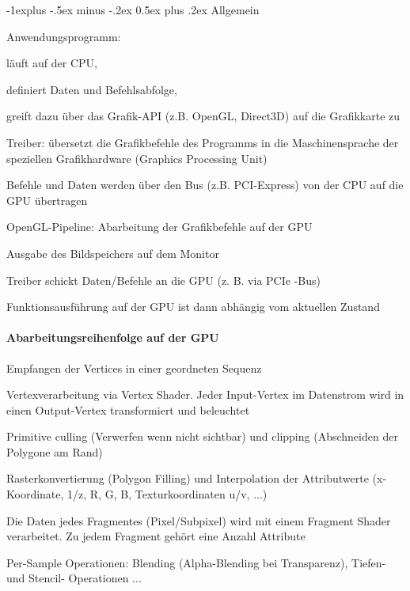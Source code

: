 \documentclass[landscape]{article}
\makeatletter
\renewcommand{\subsection}{\@startsection{subsection}{2}{0mm}%
                                {-1explus -.5ex minus -.2ex}%
                                {0.5ex plus .2ex}%
                                {\normalfont\normalsize\bfseries}}
\makeatother
\begin{document}
\begin{multicols}{3}
  \subsection{Allgemein}
  \begin{itemize*}
    \item Anwendungsprogramm:
    \begin{itemize*}
      \item läuft auf der CPU,
      \item definiert Daten und Befehlsabfolge,
      \item greift dazu über das Grafik-API (z.B. OpenGL, Direct3D) auf die Grafikkarte zu
    \end{itemize*}
    \item Treiber: übersetzt die Grafikbefehle des Programms in die Maschinensprache der speziellen Grafikhardware (Graphics Processing Unit)
    \item Befehle und Daten werden über den Bus (z.B. PCI-Express) von der CPU auf die GPU übertragen
    \item OpenGL-Pipeline: Abarbeitung der Grafikbefehle auf der GPU
    \item Ausgabe des Bildspeichers auf dem Monitor
    \item Treiber schickt Daten/Befehle an die GPU (z. B. via PCIe -Bus)
    \item Funktionsausführung auf der GPU ist dann abhängig vom aktuellen Zustand
  \end{itemize*}
  
  \paragraph{Abarbeitungsreihenfolge auf der GPU}
  \begin{itemize*}
    \item Empfangen der Vertices in einer geordneten Sequenz
    \item Vertexverarbeitung via Vertex Shader. Jeder Input-Vertex im Datenstrom wird in einen Output-Vertex transformiert und beleuchtet
    \item Primitive culling (Verwerfen wenn nicht sichtbar) und clipping (Abschneiden der Polygone am Rand)
    \item Rasterkonvertierung (Polygon Filling) und Interpolation der Attributwerte (x-Koordinate, 1/z, R, G, B, Texturkoordinaten u/v, ...)
    \item Die Daten jedes Fragmentes (Pixel/Subpixel) wird mit einem Fragment Shader verarbeitet. Zu jedem Fragment gehört eine Anzahl Attribute
    \item Per-Sample Operationen: Blending (Alpha-Blending bei Transparenz), Tiefen- und Stencil- Operationen ...
  \end{itemize*}
  

\end{multicols}
\end{document}
